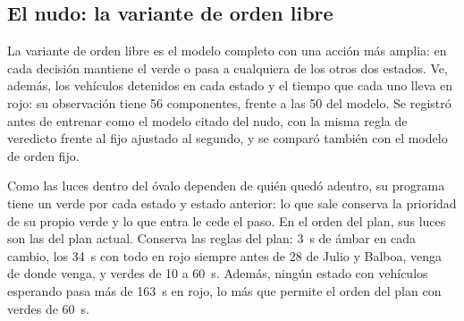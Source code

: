 \subsection*{El nudo: la variante de orden libre}

La variante de orden libre es el modelo completo con una acción más
amplia: en cada decisión mantiene el verde o pasa a cualquiera de los
otros dos estados. Ve, además, los vehículos detenidos en cada estado y
el tiempo que cada uno lleva en rojo: su observación tiene 56
componentes, frente a las 50 del modelo. Se registró antes de entrenar como
el modelo citado del nudo, con la misma regla de veredicto frente al
fijo ajustado al segundo, y se comparó también con el modelo de orden
fijo.

Como las luces dentro del óvalo dependen de quién quedó adentro, su
programa tiene un verde por cada estado y estado anterior: lo que sale
conserva la prioridad de su propio verde y lo que entra le cede el paso.
En el orden del plan, sus luces son las del plan actual. Conserva las
reglas del plan: 3~s de ámbar en cada cambio, los 34~s con todo en rojo
siempre antes de 28 de Julio y Balboa, venga de donde venga, y verdes de
10 a 60~s. Además, ningún estado con vehículos esperando pasa más de
163~s en rojo, lo más que permite el orden del plan con verdes de 60~s.

